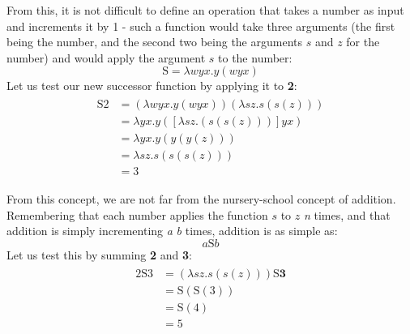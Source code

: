 \documentclass[Master.tex]{subfiles}
\begin{document}
From this, it is not difficult to define an operation that takes a number as input and increments it by 1 - such a function would take three arguments (the first being the number, and the second two being the arguments $s$ and $z$ for the number) and would apply the argument $s$ to the number:
\cite{rojas2015lambdatutorial}
\begin{equation*}
\bm{\mathrm{S}} = \lambda wyx.y(wyx)
\end{equation*}
Let us test our new successor function by applying it to \textbf{2}:
\begin{gather*}
\begin{aligned}
\bm{\mathrm{S2}} &= (\lambda wyx.y(wyx)) (\lambda sz.s(s(z)))\\
&= \lambda yx.y([\lambda sz.(s(s(z)))]yx)\\
&= \lambda yx.y(y(y(z)))\\
&= \lambda sz.s(s(s(z)))\\
&= \bm{\mathrm{3}}
\end{aligned}
\end{gather*}

From this concept, we are not far from the nursery-school concept of addition. Remembering that each number applies the function $s$ to $z$ \textit{n} times, and that addition is simply incrementing \textit{a} \textit{b} times, addition is as simple as:
\cite{rojas2015lambdatutorial}
\begin{equation*}
a\bm{\mathrm{S}}b	
\end{equation*}
Let us test this by summing \textbf{2} and \textbf{3}:
\begin{gather*}
\begin{aligned}
\bm{\mathrm{2S3}} &= (\lambda sz.s(s(z))) \bm{\mathrm{S}} \bm{\textrm{3}}\\
&= \bm{\mathrm{S}} (\bm{\mathrm{S}} (\bm{\mathrm{3}}))\\
&= \bm{\mathrm{S}} (\bm{\mathrm{4}})\\
&= \bm{\mathrm{5}}
\end{aligned}
\end{gather*}
\end{document}

